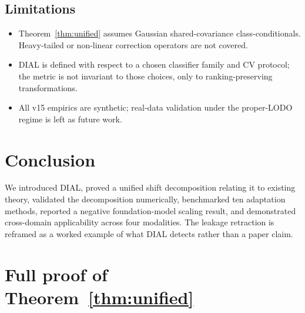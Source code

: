 \documentclass{article}
\begin{document}
\subsection{Limitations}
\begin{itemize}
\item Theorem~\ref{thm:unified} assumes Gaussian shared-covariance
  class-conditionals. Heavy-tailed or non-linear correction operators
  are not covered.
\item DIAL is defined with respect to a chosen classifier family and CV
  protocol; the metric is not invariant to those choices, only to
  ranking-preserving transformations.
\item All v15 empirics are synthetic; real-data validation under the
  proper-LODO regime is left as future work.
\end{itemize}



\section{Conclusion}

We introduced DIAL, proved a unified shift decomposition relating it to
existing theory, validated the decomposition numerically, benchmarked
ten adaptation methods, reported a negative foundation-model scaling
result, and demonstrated cross-domain applicability across four
modalities. The leakage retraction is reframed as a worked example of
what DIAL detects rather than a paper claim.






\appendix
\section{Full proof of Theorem~\ref{thm:unified}}
\label{app:proof}

\end{document}
